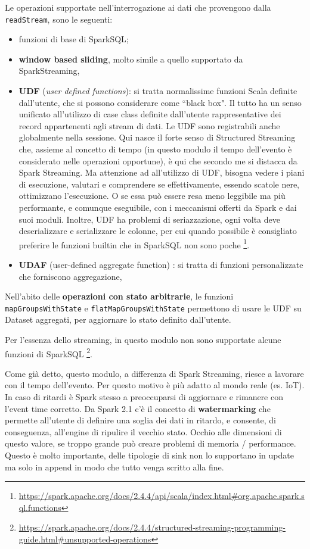 \documentclass[12pt,italian]{article}
\begin{document}
Le operazioni supportate nell'interrogazione ai dati che provengono dalla \texttt{readStream}, sono le seguenti:
\begin{itemize}
	\item funzioni di base di SparkSQL;
	\item \textbf{window based sliding}, molto simile a quello supportato da SparkStreaming,
	\item \textbf{UDF} \cite{internalsSQL} (\textit{user defined functions}): si tratta normalissime funzioni Scala definite dall'utente, che si possono considerare come ``black box". Il tutto ha un senso unificato all'utilizzo di case class definite dall'utente rappresentative dei record appartenenti agli stream di dati.
	Le UDF sono registrabili anche globalmente nella sessione.
	Qui nasce il forte senso di Structured Streaming che, assieme al concetto di tempo (in questo modulo il tempo dell'evento è considerato nelle operazioni opportune), è qui che secondo me si distacca da Spark Streaming. Ma attenzione ad all'utilizzo di UDF, bisogna vedere i piani di esecuzione, valutari e comprendere se effettivamente, essendo scatole nere, ottimizzano l'esecuzione. O se essa può essere resa meno leggibile ma più performante, e comunque eseguibile, con i meccanismi offerti da Spark e dai suoi moduli. Inoltre, UDF ha problemi di seriazzazione, ogni volta deve deserializzare e serializzare le colonne, per cui quando possibile è consigliato preferire le funzioni builtin che in SparkSQL non sono poche \footnote{\url{https://spark.apache.org/docs/2.4.4/api/scala/index.html\#org.apache.spark.sql.functions}}. 
	\item \textbf{UDAF} \cite{internalsSQL} (user-defined aggregate function) : si tratta di funzioni personalizzate che forniscono aggregazione, %
\end{itemize}
Nell'abito delle \textbf{operazioni con stato arbitrarie}, le funzioni \texttt{mapGroupsWithState} e \texttt{flatMapGroupsWithState} permettono di usare le UDF su Dataset aggregati, per aggiornare lo stato definito dall'utente.
\par Per l'essenza dello streaming, in questo modulo non sono supportate alcune funzioni di SparkSQL \footnote{\url{https://spark.apache.org/docs/2.4.4/structured-streaming-programming-guide.html\#unsupported-operations}}.

\par Come già detto, questo modulo, a differenza di Spark Streaming, riesce a lavorare con il tempo dell'evento. Per questo motivo è più adatto al mondo reale (es. IoT).
In caso di ritardi è Spark stesso a preoccuparsi di aggiornare e rimanere con l'event time corretto.
Da Spark 2.1 c'è il concetto di \textbf{watermarking} che permette all'utente di definire una soglia dei dati in ritardo, e consente, di conseguenza, all'engine di ripulire il vecchio stato.
Occhio alle dimensioni di questo valore, se troppo grande può creare problemi di memoria / performance. Questo è molto importante, delle tipologie di sink non lo supportano in update ma solo in append in modo  che tutto venga scritto alla fine.
\end{document}
